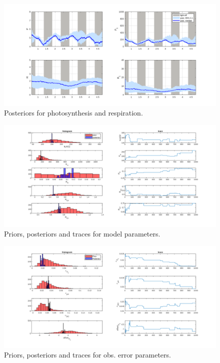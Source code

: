 \documentclass{ruthesis}
\begin{document}
\begin{figure}
	\centerline{\includegraphics[width=1.2\textwidth]{images_microalgae/plots/P_and_R}}
	\caption[.]{Posteriors for photosynthesis and respiration.}
	\label{fig:pos_P_R}
\end{figure}

\begin{figure}
	\centerline{\includegraphics[width=1.2\textwidth]{images_microalgae/plots/parameters_model}}
	\caption[.]{Priors, posteriors and traces for model parameters.}
	\label{fig:pos_parameters_model}
\end{figure}

\begin{figure}
	\centerline{\includegraphics[width=1.2\textwidth]{images_microalgae/plots/parameters_obserror}}
	\caption[.]{Priors, posteriors and traces for obs. error parameters.}
	\label{fig:pos_parameters_obserror}
\end{figure}
\end{document}
